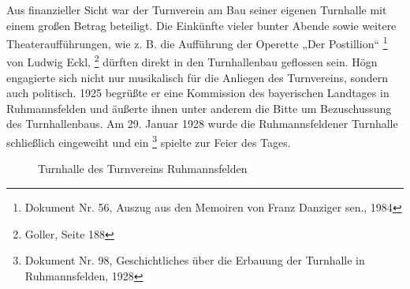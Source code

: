 Aus finanzieller Sicht war der Turnverein am Bau seiner eigenen
Turnhalle mit einem großen Betrag beteiligt. Die Einkünfte vieler
bunter Abende sowie weitere Theateraufführungen, wie z. B. die
Aufführung der Operette „Der Postillion“  \footnote{Dokument Nr. 56,
Auszug aus den Memoiren von Franz Danziger sen., 1984} von Ludwig
Eckl, \footnote{Goller, Seite 188} dürften direkt in den Turnhallenbau
geflossen sein. Högn engagierte sich nicht nur musikalisch für die
Anliegen des Turnvereins, sondern auch politisch. 1925 begrüßte er eine
Kommission des bayerischen Landtages in Ruhmannsfelden und äußerte
ihnen unter anderem die Bitte um Bezuschussung des Turnhallenbaus. Am
29. Januar 1928 wurde die Ruhmannsfeldener Turnhalle schließlich
eingeweiht und ein  \footnote{Dokument Nr. 98, Geschichtliches
über die Erbauung der Turnhalle in Ruhmannsfelden, 1928} spielte zur
Feier des Tages.

\begin{figure}
\caption{Turnhalle des Turnvereins Ruhmannsfelden}
\end{figure}
